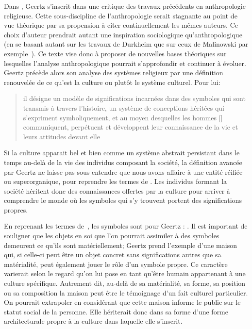 Dans , Geertz s'inscrit dans une critique des travaux précédents en anthropologie religieuse. 
Cette sous-discipline de l'anthropologie serait stagnante au point de vue théorique par sa propension à citer continuellement les mêmes auteurs. 
Ce choix d'auteur prendrait autant une inspiration sociologique qu'anthropologique (en se basant autant sur les travaux de Durkheim que sur ceux de Malinowski par exemple~\citep[20]{Geertz1972}). 
Ce texte vise donc à proposer de nouvelles bases théoriques sur lesquelles l'analyse anthropologique pourrait s'approfondir et continuer à évoluer. 
Geertz précède alors son analyse des systèmes religieux par une définition renouvelée de ce qu'est la culture ou plutôt le système culturel. 
Pour lui: \blockquote[{\cite[21]{Geertz1972}}][.]{\textelp{} il désigne un modèle de significations incarnées dans des symboles qui sont transmis à travers l'histoire, un système de conceptions héritées qui s'expriment symboliquement, et au moyen desquelles les hommes [] communiquent, perpétuent et développent leur connaissance de la vie et leurs attitudes devant elle}.

Si la culture apparait bel et bien comme un système abstrait persistant dans le temps au-delà de la vie des individus composant la société, la définition avancée par Geertz ne laisse pas sous-entendre que nous avons affaire à une entité réifiée ou superorganique, pour reprendre les termes de \citet{Duncan1980}. 
Les individus formant la société héritent donc des connaissances offertes par la culture pour arriver à comprendre le monde où les symboles qui s'y trouvent portent des significations propres.

En reprenant les termes de~\cite{Langer1962}, les symboles sont pour Geertz : . 
Il est important de souligner que les objets en soi que l'on pourrait assimiler à des symboles demeurent ce qu'ils sont matériellement; Geertz prend l'exemple d'une maison qui, si celle-ci peut être un objet concret sans significations autres que sa matérialité, peut également jouer le rôle d'un symbole propre. 
Ce caractère varierait selon le regard qu'on lui pose en tant qu'être humain appartenant à une culture spécifique. 
Autrement dit, au-delà de sa matérialité, sa forme, sa position ou sa composition la maison peut être le témoignage d'un fait culturel particulier. 
On pourrait extrapoler en considérant que cette maison informe le public sur le statut social de la personne. 
 Elle hériterait donc dans sa forme d'une forme architecturale propre à la culture dans laquelle elle s'inscrit.

